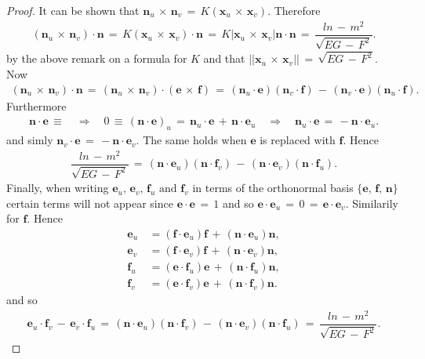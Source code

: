 \documentclass{UKZNcomp}
\newcommand{\vect}[1]{\mathbf{#1}} %
\theoremstyle{definition}
\theoremstyle{remark}
\begin{document}
\begin{proof}
It can be shown that $\vect n_u\,\times\,\vect n_v\,=\,K(\vect x_u\,\times\,\vect x_v)$. Therefore
\begin{align*}
(\vect n_u\,\times\,\vect n_v)\cdot\vect n\,=\,K(\vect x_u\,\times\,\vect x_v)\cdot\vect n\,=\,K\lvert \vect x_u\,\times\,\vect x_v\rvert\vect n\cdot \vect n\,=\,\dfrac{ln\,-\,m^2}{\sqrt{EG\,-\,F^2}}.
\end{align*}
by the above remark on a formula for $K$ and that $\lvert\lvert\vect x_u\,\times\,\vect x_v\rvert\rvert\,=\,\sqrt{EG\,-\,F^2}$. Now
\begin{align*}
(\vect n_u\,\times\,\vect n_v)\cdot\vect n\,=\,(\vect n_u\,\times\,\vect n_v)\cdot(\vect e\,\times\,\vect f)\,=\,(\vect n_u\cdot\vect e)(\vect n_v\cdot\vect f)\,-\,(\vect n_v\cdot\vect e)(\vect n_u\cdot\vect f).
\end{align*}
Furthermore
\begin{align*}
\vect n\cdot\vect e \,\equiv\quad\Longrightarrow\quad 0\,\equiv\,(\vect n\cdot\vect e)_u\,=\,\vect n_u\cdot\vect e\,+\,\vect n\cdot\vect e_u\quad\Longrightarrow\quad\vect n_u\cdot\vect e\,=\,-\vect n\cdot\vect e_u.
\end{align*}
and simly $\vect n_v\cdot\vect e\,=\,-\vect n\cdot\vect e_v$. The same holds when $\vect e$ is replaced with $\vect f$. Hence
\begin{align*}
\dfrac{ln\,-\,m^2}{\sqrt{EG\,-\,F^2}}\,=\,(\vect n\cdot\vect e_u)(\vect n\cdot\vect f_v)\,-\,(\vect n\cdot\vect e_v)(\vect n\cdot\vect f_u).
\end{align*}
Finally, when writing $\vect e_u,\,\vect e_v,\,\vect f_u\,\,\text{and}\,\,\vect f_v$ in terms of the orthonormal basis $\{\vect e,\,\vect f,\,\vect n\}$ certain terms will not appear since $\vect e\cdot\vect e\,=\,1$ and so $\vect e\cdot\vect e_u\,=\,0\,=\,\vect e\cdot\vect e_v$. Similarily for $\vect f$. Hence
\begin{align*}
\vect e_u\,&=(\vect f\cdot\vect e_u)\vect f\,+\,(\vect n\cdot\vect e_u)\vect n,\\
\vect e_v\,&=(\vect f\cdot\vect e_v)\vect f\,+\,(\vect n\cdot\vect e_v)\vect n,\\
\vect f_u\,&=(\vect e\cdot\vect f_u)\vect e\,+\,(\vect n\cdot\vect f_u)\vect n,\\
\vect f_v\,&=(\vect e\cdot\vect f_v)\vect e\,+\,(\vect n\cdot\vect f_v)\vect n.
\end{align*}
and so
\begin{align*}
\vect e_u\cdot\vect f_v\,-\,\vect e_v\cdot\vect f_u\,=\,(\vect n\cdot\vect e_u)(\vect n\cdot\vect f_v)\,-\,(\vect n\cdot\vect e_v)(\vect n\cdot\vect f_u)\,=\,\dfrac{ln\,-\,m^2}{\sqrt{EG\,-\,F^2}}.
\end{align*}
\end{proof}
\end{document}
